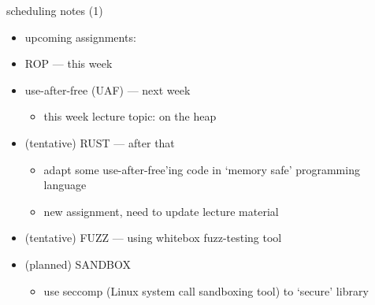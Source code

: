 \begin{frame}{scheduling notes (1)}
    \begin{itemize}
    \item upcoming assignments:
    \item ROP --- this week
    \item use-after-free (UAF) --- next week
        \begin{itemize}
        \item this week lecture topic: on the heap
        \end{itemize}
    \item (tentative) RUST --- after that
        \begin{itemize}
        \item adapt some use-after-free'ing code in `memory safe' programming language
        \item new assignment, need to update lecture material
        \end{itemize}
    \item (tentative) FUZZ --- using whitebox fuzz-testing tool
    \item (planned) SANDBOX 
        \begin{itemize}
        \item use seccomp (Linux system call sandboxing tool) to `secure' library
        \end{itemize}
    \end{itemize}
\end{frame}

